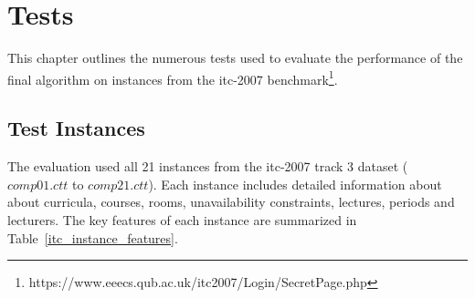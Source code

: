 
\chapter{Tests}


\label{Tests}

This chapter outlines the numerous tests used to evaluate the performance of the final algorithm on instances from the \ac{itc-2007} benchmark\footnote{https://www.eeecs.qub.ac.uk/itc2007/Login/SecretPage.php}. %

\section{Test Instances}

The evaluation used all 21 instances from the \ac{itc-2007} track 3 dataset (\(comp01.ctt\) to \(comp21.ctt\)). Each instance includes detailed information about about curricula, courses, rooms, unavailability constraints, lectures, periods and lecturers. The key features of each instance are summarized in Table~\ref{itc_instance_features}.

